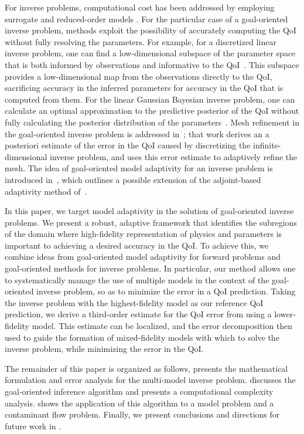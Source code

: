 For inverse problems, computational cost has been addressed by employing surrogate and reduced-order models \cite{MarzNajmRahn07, WangZab04, StefSanNav15, Frangosetal10}. For the particular case of a goal-oriented inverse problem, methods exploit the possibility of accurately computing the QoI without fully resolving the parameters. For example, for a discretized linear inverse problem, one can find a low-dimensional subspace of the parameter space that is both informed by observations and informative to the QoI~\cite{LiebWill13}. This subspace provides a low-dimensional map from the observations directly to the QoI, sacrificing accuracy in the inferred parameters for accuracy in the QoI that is computed from them. For the linear Gaussian Bayesian inverse problem, one can calculate an optimal approximation to the predictive posterior of the QoI without fully calculating the posterior distribution of the parameters~\cite{Span16}. Mesh refinement in the goal-oriented inverse problem is addressed in~\cite{BecVex05}; that work derives an a posteriori estimate of the error in the QoI caused by discretizing the infinite-dimensional inverse problem, and uses this error estimate to adaptively refine the mesh. The idea of goal-oriented model adaptivity for an inverse problem is introduced in~\cite{OdenPrudetal10}, which outlines a possible extension of the adjoint-based adaptivity method of~\cite{OdenPrudetal06}.

In this paper, we target model adaptivity in the solution of goal-oriented inverse problems. We present a robust, adaptive framework that identifies the subregions of the domain where high-fidelity representation of physics and parameters is important to achieving a desired accuracy in the QoI. To achieve this, we combine ideas from goal-oriented model adaptivity for forward problems and goal-oriented methods for inverse problems. In particular, our method allows one to systematically manage the use of multiple models in the context of the goal-oriented inverse problem, so as to minimize the error in a QoI prediction. Taking the inverse problem with the highest-fidelity model as our reference QoI prediction, we derive a third-order estimate for the QoI error from using a lower-fidelity model. This estimate can be localized, and the error decomposition then used to guide the formation of mixed-fidelity models with which to solve the inverse problem, while minimizing the error in the QoI. 

The remainder of this paper is organized as follows,  presents the mathematical formulation and error analysis for the multi-model inverse problem.  discusses the goal-oriented inference algorithm and presents a computational complexity analysis.  shows the application of this algorithm to a model problem and a contaminant flow problem. Finally, we present conclusions and directions for future work in .
